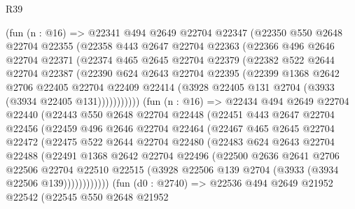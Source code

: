 \begin{lexlean}{R39}
\begin{coremodule}
        (fun (n : @16) =>
        @22341
          @494
          @2649
          @22704
          @22347
          (@22350
            @550
            @2648
            @22704
            @22355
            (@22358
              @443
              @2647
              @22704
              @22363
              (@22366
                @496
                @2646
                @22704
                @22371
                (@22374
                  @465
                  @2645
                  @22704
                  @22379
                  (@22382
                    @522
                    @2644
                    @22704
                    @22387
                    (@22390
                      @624
                      @2643
                      @22704
                      @22395
                      (@22399
                        @1368
                        @2642
                        @2706
                        @22405
                        @22704
                        @22409
                        @22414
                        (@3928 @22405 @131 @2704 (@3933 (@3934 @22405 @131)))))))))))
        (fun (n : @16) =>
        @22434
          @494
          @2649
          @22704
          @22440
          (@22443
            @550
            @2648
            @22704
            @22448
            (@22451
              @443
              @2647
              @22704
              @22456
              (@22459
                @496
                @2646
                @22704
                @22464
                (@22467
                  @465
                  @2645
                  @22704
                  @22472
                  (@22475
                    @522
                    @2644
                    @22704
                    @22480
                    (@22483
                      @624
                      @2643
                      @22704
                      @22488
                      (@22491
                        @1368
                        @2642
                        @22704
                        @22496
                        (@22500
                          @2636
                          @2641
                          @2706
                          @22506
                          @22704
                          @22510
                          @22515
                          (@3928 @22506 @139 @2704 (@3933 (@3934 @22506 @139))))))))))))
        (fun (d0 : @2740) =>
        @22536
          @494
          @2649
          @21952
          @22542
          (@22545
            @550
            @2648
            @21952

\end{coremodule}
\end{lexlean}
